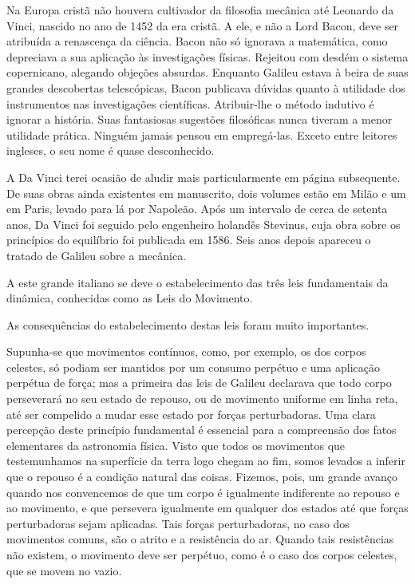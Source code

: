 \documentclass[11pt,a5paper,twoside,openany]{book}
\begin{document}
Na Europa cristã não houvera cultivador da filosofia mecânica até Leonardo da Vinci, nascido no ano de 1452 da era cristã. A ele, e não a Lord Bacon, deve ser atribuída a renascença da ciência. Bacon não só ignorava a matemática, como depreciava a sua aplicação às investigações físicas. Rejeitou com desdém o sistema copernicano, alegando objeções absurdas. Enquanto Galileu estava à beira de suas grandes descobertas telescópicas, Bacon publicava dúvidas quanto à utilidade dos instrumentos nas investigações científicas. Atribuir-lhe o método indutivo é ignorar a história. Suas fantasiosas sugestões filosóficas nunca tiveram a menor utilidade prática. Ninguém jamais pensou em empregá-las. Exceto entre leitores ingleses, o seu nome é quase desconhecido.

A Da Vinci terei ocasião de aludir mais particularmente em página subsequente. De suas obras ainda existentes em manuscrito, dois volumes estão em Milão e um em Paris, levado para lá por Napoleão. Após um intervalo de cerca de setenta anos, Da Vinci foi seguido pelo engenheiro holandês Stevinus, cuja obra sobre os princípios do equilíbrio foi publicada em 1586. Seis anos depois apareceu o tratado de Galileu sobre a mecânica.

A este grande italiano se deve o estabelecimento das três leis fundamentais da dinâmica, conhecidas como as Leis do Movimento.

As consequências do estabelecimento destas leis foram muito importantes.

Supunha-se que movimentos contínuos, como, por exemplo, os dos corpos celestes, só podiam ser mantidos por um consumo perpétuo e uma aplicação perpétua de força; mas a primeira das leis de Galileu declarava que todo corpo perseverará no seu estado de repouso, ou de movimento uniforme em linha reta, até ser compelido a mudar esse estado por forças perturbadoras. Uma clara percepção deste princípio fundamental é essencial para a compreensão dos fatos elementares da astronomia física. Visto que todos os movimentos que testemunhamos na superfície da terra logo chegam ao fim, somos levados a inferir que o repouso é a condição natural das coisas. Fizemos, pois, um grande avanço quando nos convencemos de que um corpo é igualmente indiferente ao repouso e ao movimento, e que persevera igualmente em qualquer dos estados até que forças perturbadoras sejam aplicadas. Tais forças perturbadoras, no caso dos movimentos comuns, são o atrito e a resistência do ar. Quando tais resistências não existem, o movimento deve ser perpétuo, como é o caso dos corpos celestes, que se movem no vazio.
\end{document}
